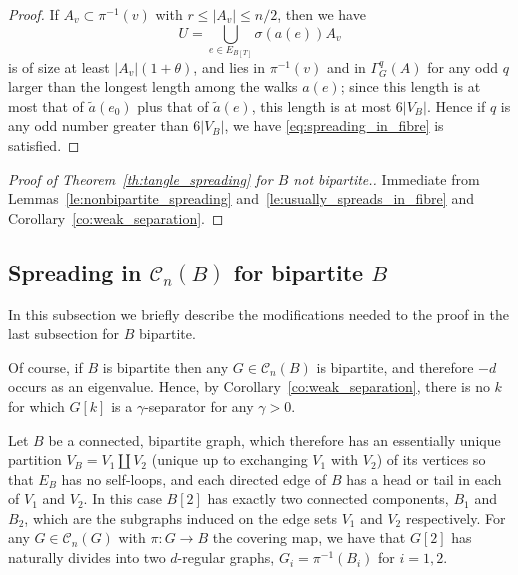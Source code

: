 \documentclass{memo-l}
\theoremstyle{plain}
\theoremstyle{definition}
\numberwithin{section}{chapter}
\numberwithin{equation}{chapter}
\newcommand{\from}{\colon}
\theoremstyle{plain}
\theoremstyle{definition}
\newcommand\cC{\mathcal{C}}
\begin{document}
\begin{proof}
If $A_v\subset \pi^{-1}(v)$ with $r\le |A_v| \le n/2$, then
we have
$$
U=\bigcup_{e\in E_{B[T]}} \sigma(a(e)) A_v
$$
is of size at least $|A_v|(1+\theta)$, and
lies in $\pi^{-1}(v)$ and in $\Gamma^q_G(A)$ for
any odd $q$ larger than the longest length among the walks 
$a(e)$; since this length is at 
most that of $\tilde a(e_0)$ plus that of $\tilde a(e)$,
this length is at most $6|V_B|$.  Hence if $q$ is any odd number
greater than $6|V_B|$, we have
\eqref{eq:spreading_in_fibre} is satisfied.
\end{proof}


\begin{proof}[Proof of Theorem~\ref{th:tangle_spreading} for $B$ not
bipartite.]
Immediate from Lemmas~\ref{le:nonbipartite_spreading}
and~\ref{le:usually_spreads_in_fibre} and
Corollary~\ref{co:weak_separation}.
\end{proof}

\subsection{Spreading in $\cC_n(B)$ for bipartite $B$}

In this subsection we briefly describe the modifications needed
to the proof in the last subsection for $B$ bipartite.

Of course, if $B$ is bipartite then any $G\in\cC_n(B)$ is bipartite,
and therefore $-d$ occurs as an eigenvalue.  Hence, by
Corollary~\ref{co:weak_separation}, there is no $k$ for which
$G[k]$ is a $\gamma$-separator for any $\gamma>0$.

Let $B$ be a connected, bipartite graph, which therefore has an
essentially
unique partition $V_B=V_1\amalg V_2$ (unique up to exchanging
$V_1$ with $V_2$) of its vertices so that $E_B$ has no self-loops,
and each directed edge of $B$ has a head or tail in each of $V_1$
and $V_2$.
In this case $B[2]$ has exactly two connected components,
$B_1$ and $B_2$, which are the subgraphs induced on the edge
sets $V_1$ and $V_2$ respectively.
For any $G\in\cC_n(G)$ with $\pi\from G\to B$ the covering map,
we have that $G[2]$ has naturally divides into two $d$-regular graphs,
$G_i=\pi^{-1}(B_i)$ for $i=1,2$.
\end{document}
